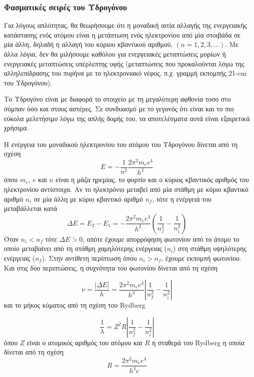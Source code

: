\subsubsection{Φασματικές σειρές του Υδρογόνου}
Για λόγους απλότητας, θα θεωρήσουμε ότι η μοναδική αιτία αλλαγής της ενεργειακής κατάστασης ενός ατόμου είναι η μετάπτωση ενός ηλεκτρονίου από μία στοιβάδα σε μία άλλη, δηλαδή η αλλαγή του κύριου κβαντικού αριθμού, $(n = 1,2,3, \dots)$. Με άλλα λόγια, δεν θα μιλήσουμε καθόλου για ενεργειακές μεταπτώσεις μορίων ή ενεργειακές μεταπτώσεις υπέρλεπτης υφής (μεταπτώσεις που προκαλούνται λόγω της αλληλεπίδρασης του πυρήνα με το ηλεκτρονιακό νέφος, π.χ. γραμμή εκπομπής 21-cm του Υδρογόνου).

Το Υδρογόνο είναι με διαφορά το στοιχείο με τη μεγαλύτερη αφθονία τοσο στο σύμπαν όσο και στους αστέρες. Σε συνδυασμό με το γεγονός ότι είναι και το πιο εύκολα μελετήσιμο λόγω της απλής δομής του, τα αποτελέσματα αυτά είναι εξαιρετικά χρήσιμα.

Η ενέργεια του μοναδικού ηλεκτρονίου του ατόμου του Υδρογόνου δίνεται από τη σχέση
\begin{equation}
    E = - \frac{1}{n^2} \frac{2\pi^2 m_e e^4}{h^2}
\end{equation}
όπου $m_e$, $e$ και $n$ είναι η μάζα ηρεμίας, το φορτίο και ο κύριος κβαντικός αριθμός του ηλεκτρονίου αντίστοιχα.
Αν το ηλεκτρόνιο μεταβεί από μία στάθμη με κύριο κβαντικό αριθμό $n_i$ σε μία άλλη με κύριο κβαντικό αριθμό $n_f$, τότε η ενέργειά του μεταβάλλεται κατά 
\begin{equation}
    \Delta E = E_2 - E_1 = - \frac{2\pi^2 m_e e^4}{h^2} \left( \frac{1}{n_f^2} - \frac{1}{n_i^2} \right)
\end{equation}
Όταν $n_i < n_f$ τότε $\Delta E > 0 $, οπότε έχουμε απορρόφηση φωτονίου από το άτομο το οποίο μεταβαίνει από τη στάθμη χαμηλότερης ενέργειας ($n_i$) στη στάθμη υψηλότερης ενέργειας ($n_f$). Στην αντίθετη περίπτωση όπου $n_i > n_f$, έχουμε εκπομπή φωτονίου. Και στις δύο περιπτώσεις, η συχνότητα του φωτονίου δίνεται από τη σχέση

\begin{equation}
    \nu = \frac{|\Delta E|}{h} = \frac{2 \pi^2 m_e e^4}{h^3} \left| \frac{1}{n_f^2} - \frac{1}{n_i^2} \right|
\end{equation}
και το μήκος κύματος από τη σχέση του Rydberg

\begin{equation}
    \label{eq:rydberg_formula}
    \frac{1}{\lambda} = Z^2 R \left| \frac{1}{n_f^2} - \frac{1}{n_i^2} \right|
\end{equation}
όπου $Z$ είναι ο ατομικός αριθμός του ατόμου και $R$ η σταθερά του Rydberg η οποία δίνεται από τη σχέση $$R = \frac{2\pi^2 m_e e^4}{h^3 c}$$

